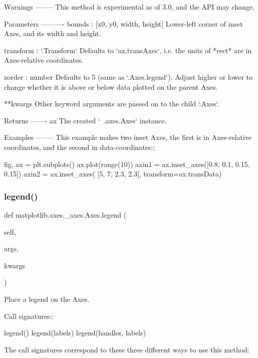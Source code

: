 \begin{DoxyVerb}
\begin{DoxyVerb}
Warnings
--------
This method is experimental as of 3.0, and the API may change.

Parameters
----------
bounds : [x0, y0, width, height]
    Lower-left corner of inset Axes, and its width and height.

transform : `.Transform`
    Defaults to `ax.transAxes`, i.e. the units of *rect* are in
    Axes-relative coordinates.

zorder : number
    Defaults to 5 (same as `.Axes.legend`).  Adjust higher or lower
    to change whether it is above or below data plotted on the
    parent Axes.

**kwargs
    Other keyword arguments are passed on to the child `.Axes`.

Returns
-------
ax
    The created `~.axes.Axes` instance.

Examples
--------
This example makes two inset Axes, the first is in Axes-relative
coordinates, and the second in data-coordinates::

    fig, ax = plt.subplots()
    ax.plot(range(10))
    axin1 = ax.inset_axes([0.8, 0.1, 0.15, 0.15])
    axin2 = ax.inset_axes(
    [5, 7, 2.3, 2.3], transform=ax.transData)\end{DoxyVerb}
 \mbox{\label{classmatplotlib_1_1axes_1_1__axes_1_1Axes_ab65185112f483952ebabe22cbf39e43e}} 
\subsubsection{\texorpdfstring{legend()}{legend()}}
{\footnotesize\ttfamily def matplotlib.\+axes.\+\_\+axes.\+Axes.\+legend (\begin{DoxyParamCaption}\item[{}]{self,  }\item[{}]{args,  }\item[{}]{kwargs }\end{DoxyParamCaption})}

\begin{DoxyVerb}Place a legend on the Axes.

Call signatures::

    legend()
    legend(labels)
    legend(handles, labels)

The call signatures correspond to these three different ways to use
this method:


\end{DoxyVerb}
\end{DoxyVerb}

